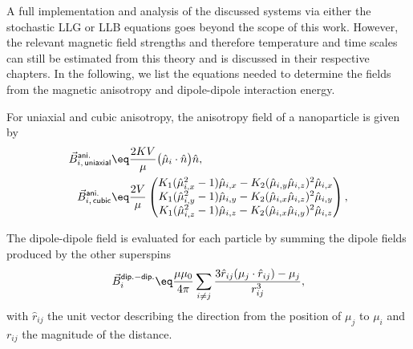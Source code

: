 \documentclass[\main/dresen_thesis.tex]{subfiles}
\begin{document}
    A full implementation and analysis of the discussed systems via either the stochastic LLG or LLB equations goes beyond the scope of this work.
    However, the relevant magnetic field strengths and therefore temperature and time scales can still be estimated from this theory and is discussed in their respective chapters.
    In the following, we list the equations needed to determine the fields from the magnetic anisotropy and dipole-dipole interaction energy.

    For uniaxial and cubic anisotropy, the anisotropy field of a nanoparticle is given by
    \begin{align}
      \vec{B}^\mathsf{ani.}_{i, \,\mathsf{uniaxial}} &\eq \frac{2 K V}{\mu} \bigl( \hat{\mu}_i \cdot \hat{n} \bigr) \hat{n},\\
      \vec{B}^\mathsf{ani.}_{i, \,\mathsf{cubic}} &\eq \frac{2 V}{\mu} \begin{pmatrix}
        K_1 (\hat{\mu}_{i, x}^2 - 1) \hat{\mu}_{i, x} - K_2 (\hat{\mu}_{i, y} \hat{\mu}_{i, z})^2 \hat{\mu}_{i, x} \\
        K_1 (\hat{\mu}_{i, y}^2 - 1) \hat{\mu}_{i, y} - K_2 (\hat{\mu}_{i, x} \hat{\mu}_{i, z})^2 \hat{\mu}_{i, y} \\
        K_1 (\hat{\mu}_{i, z}^2 - 1) \hat{\mu}_{i, z} - K_2 (\hat{\mu}_{i, x} \hat{\mu}_{i, y})^2 \hat{\mu}_{i, z}
      \end{pmatrix},
    \end{align}

    The dipole-dipole field is evaluated for each particle by summing the dipole fields produced by the other superspins
    \begin{align}
      \vec{B}^\mathsf{dip.-dip.}_i \eq \frac{\mu \mu_0}{4 \pi}  \sum_{i \neq j} \frac{3 \hat{r}_{ij}  (\mu_j \cdot \hat{r}_{ij}) - \mu_j}{r_{ij}^3},
    \end{align}
    with $\hat{r}_{ij}$ the unit vector describing the direction from the position of $\mu_j$ to $\mu_i$ and $r_{ij}$ the magnitude of the distance.

    



\end{document}
